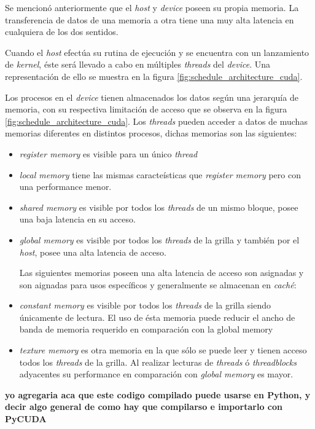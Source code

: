 Se mencionó anteriormente que el \textit{host} y \textit{device} poseen su propia memoria. La transferencia de datos de una memoria a otra tiene una muy alta latencia en cualquiera de los dos sentidos. 


Cuando el \textit{host} efectúa su rutina de ejecución y se encuentra con un lanzamiento de \textit{kernel}, éste será llevado a cabo en múltiples \textit{threads} del \textit{device}. Una representación de ello se muestra en la figura \ref{fig:schedule_architecture_cuda}. 

Los procesos en el \textit{device} tienen almacenados los datos según una jerarquía de memoria, con su respectiva limitación de acceso que se observa en la figura \ref{fig:schedule_architecture_cuda}. Los \textit{threads} pueden acceder a datos de muchas memorias diferentes en distintos procesos, dichas memorias son las siguientes:

\begin{itemize}
	\item  \textit{register memory} es visible para un único \textit{thread}
	\item \textit{local memory} tiene las mismas caracteísticas que \textit{register memory} pero con una performance menor.
	\item \textit{shared memory} es visible por todos los \textit{threads} de un mismo bloque, posee una baja latencia en su acceso.
	\item \textit{global memory} es visible por todos los \textit{threads} de la grilla y también por el \textit{host}, posee una alta latencia de acceso.
	
	Las siguientes memorias poseen una alta latencia de acceso son asignadas y son aignadas para usos específicos y generalmente se almacenan en \textit{caché}:
	
	\item \textit{constant memory} es visible por todos los \textit{threads} de la grilla siendo únicamente de lectura. El uso de ésta memoria puede reducir el ancho de banda de memoria requerido en comparación con la {global memory}
	\item \textit{texture memory} es otra memoria en la que sólo se puede leer y tienen acceso todos los \textit{threads} de la grilla. Al realizar lecturas de \textit{threads} ó \textit{threadblocks} adyacentes su performance en comparación con \textit{global memory} es mayor. 
	
\end{itemize}




\textbf{yo agregaria aca que este codigo compilado puede usarse en Python, y decir algo general de como hay que compilarso e importarlo con PyCUDA}


